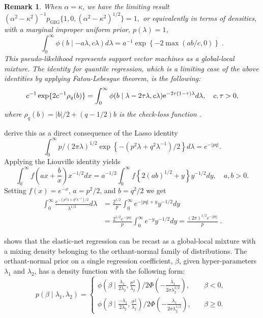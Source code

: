 \documentclass[bj]{imsart}
\newtheorem{remark}[theorem]{Remark}
\begin{document}
\begin{remark}
When $\alpha = \kappa$, we have the limiting result $(\alpha^2-\kappa^2)^{-1} p_{\mathrm{GIG}}\{1,0, (\alpha^2-\kappa^2)^{1/2} \} = 1,$
or equivalently in terms of densities, with a marginal improper uniform prior, $p(\lambda) = 1$,
\begin{equation}
  \int_{0}^{\infty} \phi(b \mid -a\lambda, c\lambda) d\lambda = a^{-1} \exp\left\{-2 \max(ab/c,0)\right\}
  \;. 
  \label{eq:svm}
\end{equation}
This pseudo-likelihood represents support vector machines as a global-local mixture. The identity for quantile regression, which is a limiting case of the above identities by applying Fatou-Lebesgue theorem, is the following: 
\[
c^{-1}\exp\{ 2c^{-1} \rho_q(b) \}= \int_{0}^{\infty} \phi( b \mid \lambda - 2\tau \lambda, c \lambda){\rm e}^{-2\tau(1-\tau)\lambda} d\lambda, \quad c, \tau > 0,
\]
where $\rho_q(b) = \rvert b \lvert / 2 + (q-1/2) b$ is the check-loss function \citep{polson_data_2013}.
\end{remark}

\citet{polson_data_2011} derive this as a direct consequence of the Lasso identity 
\[
\int_0^{\infty} p/(2 \pi \lambda)^{1/2} \exp\left\{-\left(p^2 \lambda+q^2 \lambda^{-1}\right)/2\right\} d\lambda = e^{-\lvert pq \rvert}.
\]
Applying the Liouville identity yields
\[
\int_{0}^{\infty} f\left(ax + \frac{b}{x} \right) x^{-1/2} dx = a^{-1/2} \int_{0}^{\infty} f\left\{ 2 (ab)^{1/2} + y \right\} y^{-1/2} dy, \quad a, b > 0.
\]
Setting $f(x) = e^{-x}$, $a = p^2/2$, and $b = q^2/2$ we get
\begin{align*}
  \int_0^{\infty} \frac{e^{-(p^2 \lambda + q^2 \lambda^{-1})/2}}{\lambda^{1/2}} d\lambda
  & = \frac{2^{1/2}}{p} \int_0^{\infty} e^{-|pq| + y} y^{-1/2} d y \\
  & = \frac{2^{1/2} e^{-|pq|}}{p} \int_0^{\infty} e^{-y} y^{-1/2} d y 
  = \frac{(2\pi)^{1/2} e^{-|pq|}}{p}
  \;.
\end{align*}

\citet{hans2011comment} shows that the elastic-net regression can be recast as a
global-local mixture with a mixing density belonging to the orthant-normal
family of distributions.  The orthant-normal prior on a single regression
coefficient, $\beta$, given hyper-parameters $\lambda_1$ and $\lambda_2$, 
has a density function with the following form:
\begin{equation}
  p(\beta \mid \lambda_1, \lambda_2)  = 
  \begin{cases} 
   \phi(\beta \mid \frac{\lambda_1}{2\lambda_2}, \frac{\sigma^2}{\lambda_2}) 
   / 2\Phi\left(-\frac{\lambda_1}{2\sigma \lambda_2^{1/2} }\right), & \quad \beta < 0, 
   \\
   \phi(\beta \mid \frac{-\lambda_1}{2\lambda_2}, \frac{\sigma^2}{\lambda_2}) / 
   2\Phi\left(-\frac{\lambda_1}{2\sigma \lambda_2^{1/2} }\right), & \quad \beta \geq 0.
  \end{cases} 
  \;
  \label{eq:hans}
\end{equation}
\end{document}
